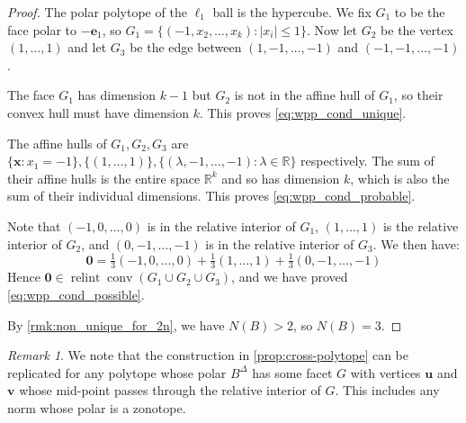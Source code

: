 \documentclass[10pt]{article}
\theoremstyle{definition}
\theoremstyle{remark}
\newtheorem{remark}[theorem]{Remark}
\newcommand{\R}{\mathbb{R}}
\DeclareMathOperator{\conv}{conv}
\DeclareMathOperator{\relint}{relint}
\renewcommand{\vec}[1]{\mathbf{#1}}
\begin{document}
	\begin{proof}
		The polar polytope of the $\ell_1$ ball is the hypercube. We fix $G_1$ to be the face polar to $-\vec e_1$, so $G_1 = \{ (-1, x_2, \dots, x_k): |x_i| \leq 1 \}$. Now let $G_2$ be the vertex $(1,\dots, 1)$ and let $G_3$ be the edge between $ (1, -1, \dots, -1)$ and $(-1, -1, \dots, -1)$. 
		
		The face $G_1$ has dimension $k-1$ but $G_2$ is not in the affine hull of $G_1$, so their convex hull must have dimension $k$. This proves \cref{eq:wpp_cond_unique}.
		
		The affine hulls of $G_1, G_2, G_3$ are $\{ \vec x : x_1 = -1 \}, \{ (1,\dots, 1) \}, \{ (\lambda, -1, \dots, -1): \lambda \in \R \}$ respectively. The sum of their affine hulls is the entire space $\R^k$ and so has dimension $k$, which is also the sum of their individual dimensions. This proves \cref{eq:wpp_cond_probable}. 
		
		Note that $(-1, 0,\dots, 0)$ is in the relative interior of $G_1$, $(1,\dots, 1)$ is the relative interior of $G_2$, and $(0, -1, \dots, -1)$ is in the relative interior of $G_3$. We then have:
		\[
		\vec 0 = \tfrac{1}{3} (-1, 0,\dots, 0) + \tfrac{1}{3} (1,\dots, 1) + \tfrac{1}{3} (0, -1, \dots, -1)
		\] 
		Hence $\vec 0 \in \relint \conv (G_1 \cup G_2 \cup G_3)$, and we have proved \cref{eq:wpp_cond_possible}.
		
		By \cref{rmk:non_unique_for_2n}, we have $N(B)>2$, so $N(B) = 3$.
	\end{proof}
	
	\begin{remark}
		We note that the construction in \cref{prop:cross-polytope} can be replicated for any polytope whose polar $B^{\Delta}$ has some facet $G$ with vertices $\vec u$ and $\vec v$ whose mid-point passes through the relative interior of $G$. This includes any norm whose polar is a zonotope.
	\end{remark}
	
\end{document}
